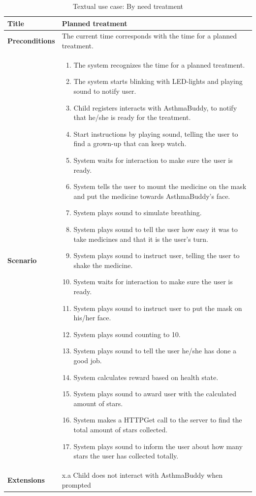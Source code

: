 \begin{table}[H]
\begin{tabular}{|p{4.0cm} | p{9.0cm} |}
\hline
\textbf{Title} & Planned treatment \\
\hline
\textbf{Preconditions} & The current time corresponds with the time for a planned treatment. \\
\hline 
\textbf{Scenario} & 
	\begin{enumerate}
	  \itemsep0em
	  \item The system recognizes the time for a planned treatment.
	  \item The system starts blinking with LED-lights and playing sound to notify user.
	  \item Child registers interacts with AsthmaBuddy, to notify that he/she is ready for the treatment.
	  \item Start instructions by playing sound, telling the user to find a grown-up that can keep watch.
	  \item System waits for interaction to make sure the user is ready.
	  \item System tells the user to mount the medicine on the mask and put the medicine towards AsthmaBuddy's face.
	  \item System plays sound to simulate breathing.
	  \item System plays sound to tell the user how easy it was to take medicines and that it is the user's turn.
	  \item System plays sound to instruct user, telling the user to shake the medicine.
	  \item System waits for interaction to make sure the user is ready.
	  \item System plays sound to instruct user to put the mask on his/her face.
	  \item System plays sound counting to 10. 
	  \item System plays sound to tell the user he/she has done a good job.
	  \item System calculates reward based on health state.
	  \item System plays sound to award user with the calculated amount of stars.
	  \item System makes a HTTPGet call to the server to find the total amount of stars collected.
	  \item System plays sound to inform the user about how many stars the user has collected totally.
	\end{enumerate}
\\
\hline
	\textbf{Extensions} & 
		x.a Child does not interact with AsthmaBuddy when prompted
\\
\hline
\end{tabular}
\caption{Textual use case: By need treatment}
\label{tab:textual-use-case}
\end{table} 


